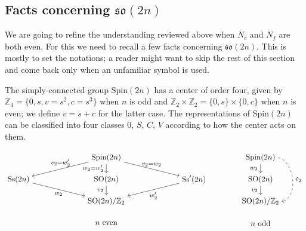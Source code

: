 \documentclass[12pt]{article}
\numberwithin{equation}{section}
\renewenvironment{figure}[1][]{
  \begin{originalfigure}[#1]
    \begin{mdframed}[linecolor=black!0,backgroundcolor=black!1]
}{
    \end{mdframed}
  \end{originalfigure}
}
\newcommand*{\bZ}{\mathbb{Z}}
\def\SO{\mathrm{SO}}
\def\so{\mathfrak{so}}
\def\Spin{\mathrm{Spin}}
\begin{document}
\subsection{Facts concerning $\so(2n)$}
\label{sec:math}
We are going to refine the understanding reviewed above when $N_c$ and $N_f$ are both even.
For this we need to recall a few facts concerning $\so(2n)$.
This is mostly to set the notations;
a reader might want to skip the rest of this section and come back only when an unfamiliar symbol is used.

The simply-connected group $\Spin(2n)$ has a center  of order four,
given by $\bZ_4=\{0,s,v=s^2,c=s^3\}$ when $n$ is odd
and $\bZ_2\times \bZ_2=\{0,s\}\times \{0,c\}$ when $n$ is even;
we define $v=s+c$ for the latter case.
The representations of $\Spin(2n)$ can be classified into four classes $0$, $S$, $C$, $V$
according to how the center acts on them.


\begin{figure}
\[
\begin{tikzpicture}[scale=.5,baseline=(SO.base)]
\node(Spin) at (0,0) {$\Spin(2n)$};
\node(Ss) at (-8,-2) {$\mathrm{Ss}(2n)$};
\node(SO) at (0,-2) {$\SO(2n)$};
\node(Ss') at (+8,-2) {$\mathrm{Ss}'(2n)$};
\node(PSO) at (0,-4) {$\SO(2n)/\bZ_2$};
\node(legend) at (0,-6) {$n$ even};
\draw[->] (Spin) to node[above]{\footnotesize $v_2{=}w_2'$}  (Ss); 
\draw[->] (Spin) to node[left]{\footnotesize $w_2{=}w_2'$}  (SO); 
\draw[->] (Spin) to node[above]{\footnotesize $v_2{=}w_2$}  (Ss'); 
\draw[->] (Ss) to node[below]{\footnotesize $w_2$} (PSO);
\draw[->] (SO) to node[left]{\footnotesize $v_2$} (PSO);
\draw[->] (Ss') to node[below]{\footnotesize $w_2'$} (PSO);
\end{tikzpicture}
\qquad\qquad
\begin{tikzpicture}[scale=.5,baseline=(SO.base)]
\node(Spin) at (0,0) {$\Spin(2n)$};
\node(SO) at (0,-2) {$\SO(2n)$};
\node(PSO) at (0,-4) {$\SO(2n)/\bZ_2$};
\node(legend) at (0,-6) {$n$ odd};
\draw[->] (Spin) to node[left]{\footnotesize $w_2$}  (SO); 
\draw[->] (SO) to node[left]{\footnotesize $v_2$} (PSO);
\draw[->,dashed,out=-10,in=10] (Spin.east) to node[right]{\footnotesize $\tilde v_2$}  (PSO.east); 
\end{tikzpicture}
\]
\caption{%
Various quotients of $\Spin(2n)$ and the characteristic classes associated to their bundles. 
Solid arrows are $\bZ_2$ quotients and the dashed arrow is a $\bZ_4$ quotient.
Each arrow is labeled by the corresponding obstruction classes.
\label{fig:classes}}
\end{figure}
\end{document}

